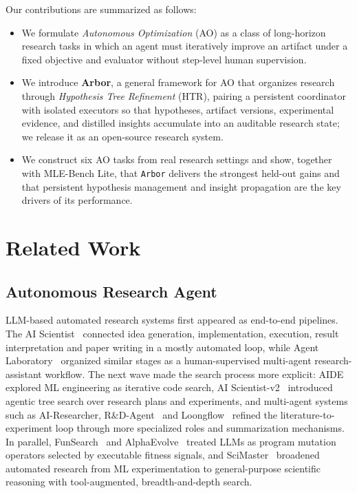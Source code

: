 \documentclass{llmxive}
\providecommand{\arbor}{\texttt{Arbor}}
\begin{document}
Our contributions are summarized as follows:

\begin{itemize}
\item We formulate \emph{Autonomous Optimization} (AO) as a class of long-horizon research tasks in which an agent must iteratively improve an artifact under a fixed objective and evaluator without step-level human supervision.
\item We introduce \textbf{Arbor}, a general framework for AO that organizes research through \emph{Hypothesis Tree Refinement} (HTR), pairing a persistent coordinator with isolated executors so that hypotheses, artifact versions, experimental evidence, and distilled insights accumulate into an auditable research state; we release it as an open-source research system.
\item We construct six AO tasks from real research settings and show, together with MLE-Bench Lite, that \arbor{} delivers the strongest held-out gains and that persistent hypothesis management and insight propagation are the key drivers of its performance.
\end{itemize}



\section{Related Work}\label{sec:related}
\subsection{Autonomous Research Agent}
LLM-based automated research systems first appeared as end-to-end pipelines. The AI Scientist~\citep{aiscientist} connected idea generation, implementation, execution, result interpretation and paper writing in a mostly automated loop, while Agent Laboratory~\citep{agentlaboratory} organized similar stages as a human-supervised multi-agent research-assistant workflow. The next wave made the search process more explicit: AIDE~\citep{aide} explored ML engineering as iterative code search, AI Scientist-v2~\citep{aiscientistv2} introduced agentic tree search over research plans and experiments, and multi-agent systems such as AI-Researcher, R\&D-Agent~\citep{rdagent} and Loongflow~\citep{loongflow} refined the literature-to-experiment loop through more specialized roles and summarization mechanisms. In parallel, FunSearch~\citep{funsearch} and AlphaEvolve~\citep{alphaevolve} treated LLMs as program mutation operators selected by executable fitness signals, and SciMaster~\citep{scimaster} broadened automated research from ML experimentation to general-purpose scientific reasoning with tool-augmented, breadth-and-depth search.
\end{document}
